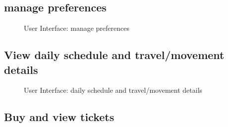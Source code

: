 \subsection{manage preferences}
\begin{figure}[!h]
	\centering
	\caption{User Interface: manage preferences}
\end{figure}
\clearpage

\subsection{View daily schedule and travel/movement details}

\begin{figure}[!h]
	\centering
	\caption{User Interface: daily schedule and travel/movement details}
\end{figure}
\clearpage

\subsection{Buy and view tickets}

